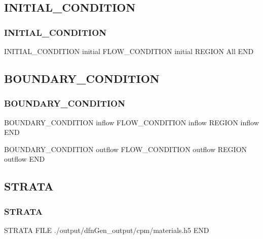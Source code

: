 \documentclass{beamer}
\newcommand\magentacomment[1]{{{\color{magenta} #1}}}
\begin{document}
\subsection{INITIAL\_CONDITION}

\begin{frame}[fragile]\frametitle{INITIAL\_CONDITION}

\begin{semiverbatim}

INITIAL_CONDITION initial
  FLOW_CONDITION initial
  REGION All
END

\end{semiverbatim}

\end{frame}

\subsection{BOUNDARY\_CONDITION}

\begin{frame}\frametitle{BOUNDARY\_CONDITION}

\small
\begin{semiverbatim}
BOUNDARY_CONDITION inflow
  FLOW_CONDITION inflow
  REGION inflow
END

BOUNDARY_CONDITION outflow
  FLOW_CONDITION outflow
  REGION outflow
END

\end{semiverbatim}

\end{frame}

\subsection{STRATA}

\begin{frame}[fragile]\frametitle{STRATA}

\begin{semiverbatim}

STRATA
  \magentacomment{FILE ./output/dfnGen_output/cpm/materials.h5}
END
\end{semiverbatim}

\end{frame}

\end{document}
